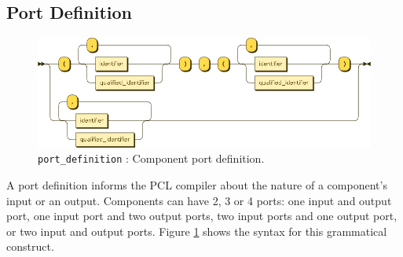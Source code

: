 \subsection{Port Definition}
\begin{figure}[h!]
  \centering
    \includegraphics[scale=\DiagramScale,angle=90]{chapters/compiler/diagrams/port_definition}
  \caption{\texttt{port\_definition} : Component port definition.}
  \label{fig:pcl-port-def}
\end{figure}
A port definition informs the PCL compiler about the nature of a component's input or an output. Components can have 2, 3 or 4 ports: one input and output port, one input port and two output ports, two input ports and one output port, or two input and output ports. Figure \ref{fig:pcl-port-def} shows the syntax for this grammatical construct.

